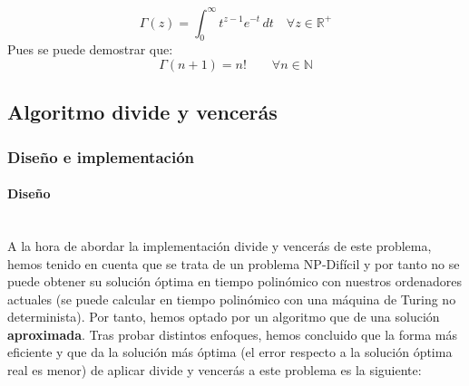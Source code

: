 \documentclass{article}
\newcommand{\myparagraph}[1]{\paragraph{#1}\mbox{}\\}
\begin{document}
\[
\Gamma(z) = \int_{0}^{\infty} t^{z-1}e^{-t}\,dt \quad \forall z \in \mathbb{R^{+}}
\]
Pues se puede demostrar que:
\[
\Gamma(n+1) = n! \qquad \forall n \in \mathbb{N}
\]


\subsection{Algoritmo divide y vencerás}

\subsubsection{Diseño e implementación} %
\myparagraph{Diseño}
A la hora de abordar la implementación divide y vencerás de este problema, hemos tenido en cuenta que se trata de un problema NP-Difícil y por tanto no se puede obtener su solución óptima en tiempo polinómico con nuestros ordenadores actuales (se puede calcular en tiempo polinómico con una máquina de Turing no determinista). Por tanto, hemos optado por un algoritmo que de una solución \textbf{aproximada}.
\newline
Tras probar distintos enfoques, hemos concluido que la forma más eficiente y que da la solución más óptima (el error respecto a la solución óptima real es menor) de aplicar divide y vencerás a este problema es la siguiente: 
\end{document}
